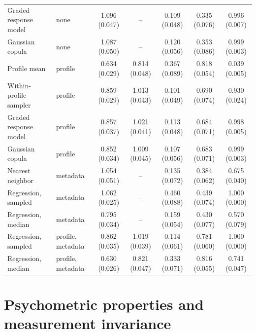 \begin{table}[pos=!htbp]
\begin{tabular*}{\textwidth}{@{\extracolsep{\fill}}llccccc@{}}
Graded response model & none & 1.096 (0.047) & -- & 0.109 (0.048) & 0.335 (0.076) & 0.996 (0.007) \\
Gaussian copula & none & 1.087 (0.050) & -- & 0.120 (0.056) & 0.353 (0.086) & 0.999 (0.003) \\
Profile mean & profile & 0.634 (0.029) & 0.814 (0.048) & 0.367 (0.089) & 0.818 (0.054) & 0.039 (0.005) \\
Within-profile sampler & profile & 0.859 (0.029) & 1.013 (0.043) & 0.101 (0.049) & 0.690 (0.074) & 0.930 (0.024) \\
Graded response model & profile & 0.857 (0.037) & 1.021 (0.041) & 0.113 (0.048) & 0.684 (0.071) & 0.998 (0.005) \\
Gaussian copula & profile & 0.852 (0.034) & 1.009 (0.045) & 0.107 (0.056) & 0.683 (0.071) & 0.999 (0.003) \\
Nearest neighbor & metadata & 1.054 (0.051) & -- & 0.135 (0.072) & 0.384 (0.062) & 0.675 (0.040) \\
Regression, sampled & metadata & 1.062 (0.025) & -- & 0.460 (0.088) & 0.439 (0.074) & 1.000 (0.000) \\
Regression, median & metadata & 0.795 (0.034) & -- & 0.159 (0.054) & 0.430 (0.077) & 0.570 (0.079) \\
Regression, sampled & profile, metadata & 0.862 (0.035) & 1.019 (0.039) & 0.114 (0.061) & 0.781 (0.060) & 1.000 (0.000) \\
Regression, median & profile, metadata & 0.630 (0.026) & 0.821 (0.047) & 0.333 (0.071) & 0.816 (0.055) & 0.741 (0.047) \\
\bottomrule
\end{tabular*}
\end{table}

\clearpage

\section{Psychometric properties and measurement invariance}
\label{app:e}

